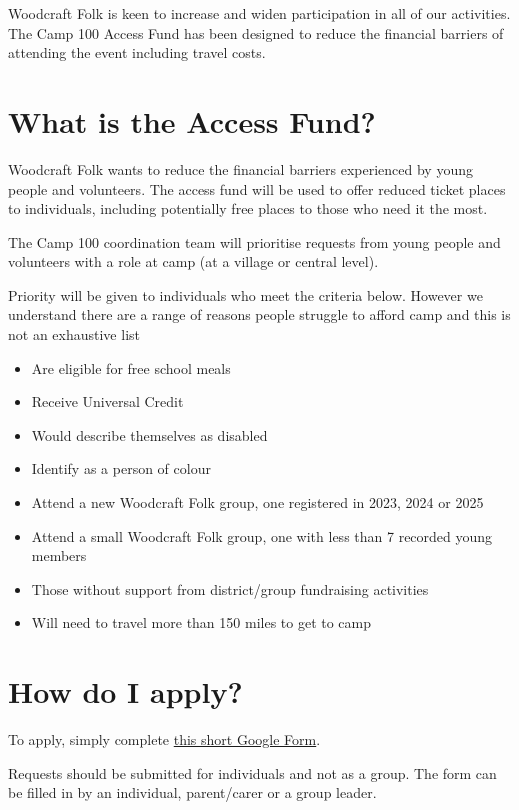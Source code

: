 \documentclass[a4paper, 11pt]{article}
\begin{document}
\makedocumenttitlepage
Woodcraft Folk is keen to increase and widen participation in all of our activities. The Camp 100 Access Fund has been designed to reduce the financial barriers of attending the event including travel costs.

\section{What is the Access Fund?}
Woodcraft Folk wants to reduce the financial barriers experienced by young people and volunteers. The access fund will be used to offer reduced ticket places to individuals, including potentially free places to those who need it the most.

The Camp 100 coordination team will prioritise requests from young people and volunteers with a role at camp (at a village or central level).

Priority will be given to individuals who meet the criteria below. However we understand there are a range of reasons people struggle to afford camp and this is not an exhaustive list

\begin{itemize}
    \item Are eligible for free school meals
    \item Receive Universal Credit
    \item Would describe themselves as disabled
    \item Identify as a person of colour
    \item Attend a new Woodcraft Folk group, one registered in 2023, 2024 or 2025
    \item Attend a small Woodcraft Folk group, one with less than 7 recorded young members
    \item Those without support from district/group fundraising activities
    \item Will need to travel more than 150 miles to get to camp
\end{itemize}

\section{How do I apply?}
To apply, simply complete \href{https://forms.gle/aSqy3JNRQqcNRTE79}{this short Google Form}.

Requests should be submitted for individuals and not as a group. The form can be filled in by an individual, parent/carer or a group leader.
\end{document}
